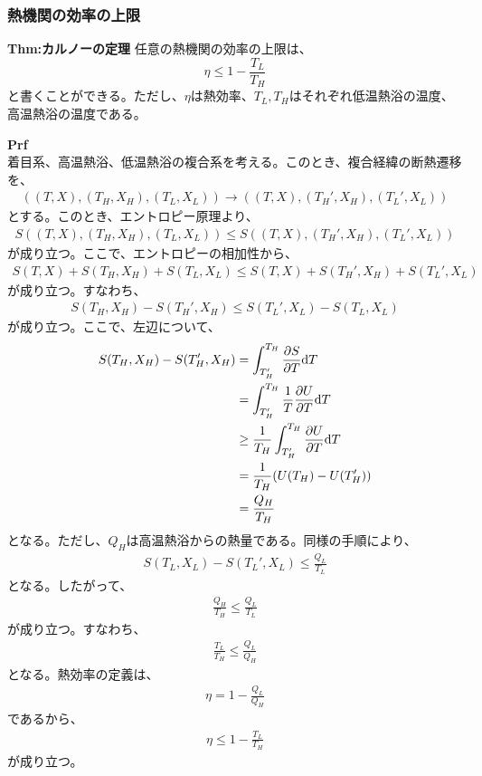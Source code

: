 \documentclass[a4paper,11pt]{jsarticle}
\numberwithin{equation}{section}
\begin{document}
\subsubsection{熱機関の効率の上限}
\begin{itembox}[l]{\textbf{Thm:カルノーの定理}}
  任意の熱機関の効率の上限は、
  \begin{equation}
    \eta \leq 1-\frac{T_L}{T_H}
  \end{equation}
  と書くことができる。ただし、$\eta$は熱効率、$T_L,T_H$はそれぞれ低温熱浴の温度、高温熱浴の温度である。

\end{itembox}
\textbf{Prf}\\
着目系、高温熱浴、低温熱浴の複合系を考える。このとき、複合経緯の断熱遷移を、
\begin{align}
  ((T,X),(T_H,X_H),(T_L,X_L)) \rightarrow ((T,X),(T_H',X_H),(T_L',X_L))
\end{align}
とする。このとき、エントロピー原理より、
\begin{align}
  S((T,X),(T_H,X_H),(T_L,X_L)) \leq S((T,X),(T_H',X_H),(T_L',X_L))
\end{align}
が成り立つ。ここで、エントロピーの相加性から、
\begin{align}
  S(T,X)+S(T_H,X_H)+S(T_L,X_L) \leq S(T,X)+S(T_H',X_H)+S(T_L',X_L)
\end{align}
が成り立つ。すなわち、
\begin{align}
  S(T_H,X_H) - S(T_H',X_H) \leq S(T_L',X_L) - S(T_L,X_L)
\end{align}
が成り立つ。ここで、左辺について、
\begin{align}
  S(T_H,X_H) - S(T_H',X_H) &= \int_{T_H'}^{T_H} \pdv{S}{T} \dd T\\
  &= \int_{T_H'}^{T_H} \frac{1}{T} \pdv{U}{T} \dd T\\
  &\geq \frac{1}{T_H} \int_{T_H'}^{T_H} \pdv{U}{T} \dd T\\
  &= \frac{1}{T_H} (U(T_H)-U(T_H'))\\
  &= \frac{Q_H}{T_H}
\end{align}
となる。ただし、$Q_H$は高温熱浴からの熱量である。同様の手順により、
\begin{align}
  S(T_L,X_L) - S(T_L',X_L) \leq \frac{Q_L}{T_L}
\end{align}
となる。したがって、
\begin{align}
  \frac{Q_H}{T_H} \leq \frac{Q_L}{T_L}
\end{align}
が成り立つ。すなわち、
\begin{align}
  \frac{T_L}{T_H} \leq \frac{Q_L}{Q_H}
\end{align}
となる。熱効率の定義は、
\begin{align}
  \eta = 1 - \frac{Q_L}{Q_H}
\end{align}
であるから、
\begin{align}
  \eta \leq 1 - \frac{T_L}{T_H}
\end{align}
が成り立つ。\hfill\qedsymbol\\
\end{document}

